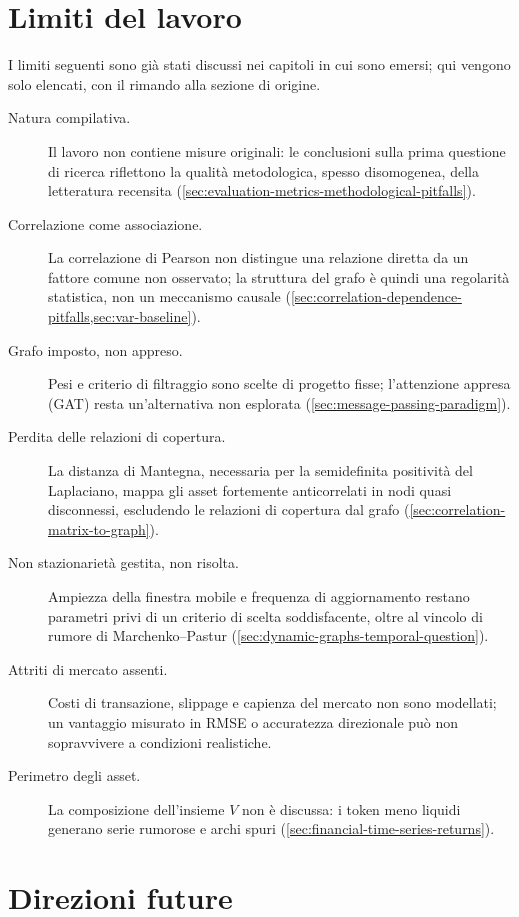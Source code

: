 \section{Limiti del lavoro}
\label{sec:limitations}

I limiti seguenti sono già stati discussi nei capitoli in cui sono emersi; qui vengono solo elencati, con il rimando alla sezione di origine.

\begin{description}
    \item[Natura compilativa.] Il lavoro non contiene misure originali: le conclusioni sulla prima questione di ricerca riflettono la qualità metodologica, spesso disomogenea, della letteratura recensita (\cref{sec:evaluation-metrics-methodological-pitfalls}).
    \item[Correlazione come associazione.] La correlazione di Pearson non distingue una relazione diretta da un fattore comune non osservato; la struttura del grafo è quindi una regolarità statistica, non un meccanismo causale (\cref{sec:correlation-dependence-pitfalls,sec:var-baseline}).
    \item[Grafo imposto, non appreso.] Pesi e criterio di filtraggio sono scelte di progetto fisse; l'attenzione appresa (GAT) resta un'alternativa non esplorata (\cref{sec:message-passing-paradigm}).
    \item[Perdita delle relazioni di copertura.] La distanza di Mantegna, necessaria per la semidefinita positività del Laplaciano, mappa gli asset fortemente anticorrelati in nodi quasi disconnessi, escludendo le relazioni di copertura dal grafo (\cref{sec:correlation-matrix-to-graph}).
    \item[Non stazionarietà gestita, non risolta.] Ampiezza della finestra mobile e frequenza di aggiornamento restano parametri privi di un criterio di scelta soddisfacente, oltre al vincolo di rumore di Marchenko--Pastur (\cref{sec:dynamic-graphs-temporal-question}).
    \item[Attriti di mercato assenti.] Costi di transazione, slippage e capienza del mercato non sono modellati; un vantaggio misurato in RMSE o accuratezza direzionale può non sopravvivere a condizioni realistiche.
    \item[Perimetro degli asset.] La composizione dell'insieme $V$ non è discussa: i token meno liquidi generano serie rumorose e archi spuri (\cref{sec:financial-time-series-returns}).
\end{description}

\section{Direzioni future}
\label{sec:future-directions}

